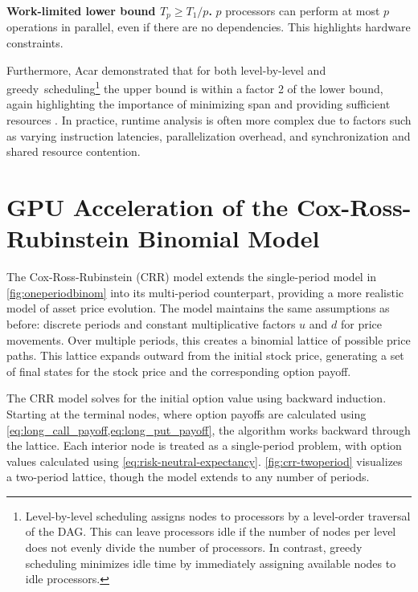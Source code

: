\documentclass[english,12pt,a4paper,pdftex,sci,utf8]{aaltothesis}
\begin{document}
\vspace{0.5\baselineskip}
\noindent\textbf{Work-limited lower bound $T_p \geq T_1/p$.} $p$ processors can perform at most $p$ operations in parallel, even if there are no dependencies. This highlights hardware constraints.

\vspace{0.5\baselineskip}
\noindent Furthermore, Acar demonstrated that for both level-by-level and \mbox{greedy scheduling}\footnote{Level-by-level scheduling assigns nodes to processors by a level-order traversal of the DAG. This can leave processors idle if the number of nodes per level does not evenly divide the number of processors. In contrast, greedy scheduling minimizes idle time by immediately assigning available nodes to idle processors.} the upper bound is within a factor 2 of the lower bound, again highlighting the importance of minimizing span and providing sufficient resources \cite{acar2016parallel}. In practice, runtime analysis is often more complex due to factors such as varying instruction latencies, parallelization overhead, and synchronization and shared resource contention.
\clearpage

\section{GPU Acceleration of the Cox-Ross-Rubinstein Binomial Model} \label{sec:gpu-crr}
The Cox-Ross-Rubinstein (CRR) model \cite{cox1979option} extends the single-period model in \cref{fig:oneperiodbinom} into its multi-period counterpart, providing a more realistic model of asset price evolution. The model maintains the same assumptions as before: discrete periods and constant multiplicative factors $u$ and $d$ for price movements. Over multiple periods, this creates a binomial lattice of possible price paths. This lattice expands outward from the initial stock price, generating a set of final states for the stock price and the corresponding option payoff.

The CRR model solves for the initial option value using backward induction. Starting at the terminal nodes, where option payoffs are calculated using \cref{eq:long_call_payoff,eq:long_put_payoff}, the algorithm works backward through the lattice. Each interior node is treated as a single-period problem, with option values calculated using \cref{eq:risk-neutral-expectancy}. \cref{fig:crr-twoperiod} visualizes a two-period lattice, though the model extends to any number of periods.
\end{document}
